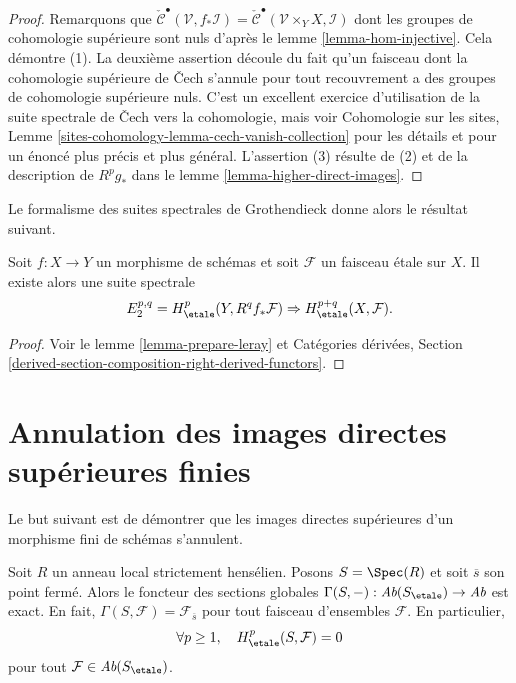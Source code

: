 \begin{proof}
Remarquons que $\check{\mathcal{C}}^\bullet(\mathcal{V}, f_*\mathcal{I}) =
\check{\mathcal{C}}^\bullet(\mathcal{V} \times_Y X, \mathcal{I})$
dont les groupes de cohomologie sup\'erieure sont nuls d'apr\`es le lemme \ref{lemma-hom-injective}.
Cela d\'emontre (1). La deuxi\`eme assertion d\'ecoule du fait qu'un faisceau dont
la cohomologie sup\'erieure de {\v C}ech s'annule pour tout recouvrement a des groupes de
cohomologie sup\'erieure nuls. C'est un excellent exercice d'utilisation de la
suite spectrale de {\v C}ech vers la cohomologie, mais voir
Cohomologie sur les sites, Lemme \ref{sites-cohomology-lemma-cech-vanish-collection}
pour les d\'etails et pour un \'enonc\'e plus pr\'ecis et plus g\'en\'eral.
L'assertion (3) r\'esulte de (2) et de la description de
$R^pg_*$ dans le lemme \ref{lemma-higher-direct-images}.
\end{proof}

\noindent
Le formalisme des suites spectrales de Grothendieck donne alors le
r\'esultat suivant.

\begin{proposition}
\label{proposition-leray}
Soit $f: X \to Y$ un morphisme de sch\'emas et soit $\mathcal{F}$ un faisceau \'etale sur
$X$. Il existe alors une suite spectrale
$$
E_2^{p, q} = H_\etale^p(Y, R^qf_*\mathcal{F}) \Rightarrow
H_\etale^{p+q}(X, \mathcal{F}).
$$
\end{proposition}

\begin{proof}
Voir le lemme \ref{lemma-prepare-leray} et
Cat\'egories d\'eriv\'ees, Section
\ref{derived-section-composition-right-derived-functors}.
\end{proof}









\section{Annulation des images directes sup\'erieures finies}
\label{section-vanishing-finite-morphism}

\noindent
Le but suivant est de d\'emontrer que les images directes sup\'erieures d'un morphisme fini de
sch\'emas s'annulent.

\begin{lemma}
\label{lemma-vanishing-etale-cohomology-strictly-henselian}
Soit $R$ un anneau local strictement hens\'elien. Posons $S = \Spec(R)$ et soit
$\overline{s}$ son point ferm\'e. Alors le foncteur des
sections globales
$\Gamma(S, -) : \textit{Ab}(S_\etale) \to \textit{Ab}$
est exact. En fait, $\Gamma(S, \mathcal{F}) = \mathcal{F}_{\overline{s}}$
pour tout faisceau d'ensembles $\mathcal{F}$. En particulier,
$$
\forall p\geq 1, \quad H_\etale^p(S, \mathcal{F})=0
$$
pour tout $\mathcal{F}\in \textit{Ab}(S_\etale)$.
\end{lemma}

